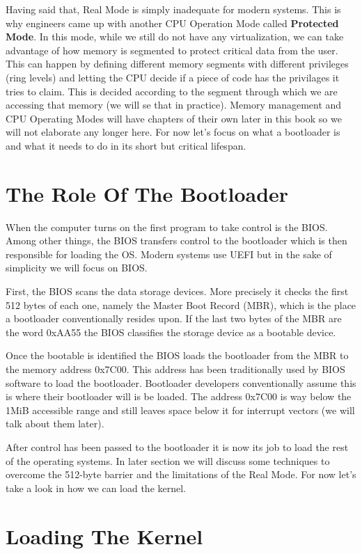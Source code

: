 Having said that, Real Mode is simply inadequate for modern systems. This is why engineers came up with another CPU 
Operation Mode called \textbf{Protected Mode}. In this mode, while we still do not have any virtualization, we can 
take advantage of how memory is segmented to protect critical data from the user. This can happen by defining different 
memory segments with different privileges (ring levels) and letting the CPU decide if a piece of code has the privilages 
it tries to claim. This is decided according to the segment through which we are accessing that memory (we will se that in
practice). Memory management and CPU Operating Modes will have chapters of their own later in this book so we will not 
elaborate any longer here. For now let's focus on what a bootloader is and what it needs to do in its short but 
critical lifespan. 

\section{The Role Of The Bootloader}

When the computer turns on the first program to take control is the BIOS. Among other things, the BIOS transfers control to 
the bootloader which is then responsible for loading the OS. Modern systems use UEFI but in the sake of simplicity we 
will focus on BIOS.

First, the BIOS scans the data storage devices. More precisely it checks the first 512 bytes of each one, namely the Master Boot Record 
(MBR), which is the place a bootloader conventionally resides upon. If the last two bytes of the MBR are the word 0xAA55 the BIOS 
classifies the storage device as a bootable device.

Once the bootable is identified the BIOS loads the bootloader from the MBR to the memory address 0x7C00. This address has been
traditionally used by BIOS software to load the bootloader. Bootloader developers conventionally assume this is where their 
bootloader will is be loaded. The address 0x7C00 is way below the 1MiB accessible range and still leaves space below 
it for interrupt vectors (we will talk about them later).

After control has been passed to the bootloader it is now its job to load the rest of the operating systems. In later section we will 
discuss some techniques to overcome the 512-byte barrier and the limitations of the Real Mode. For now let's take a look in how
we can load the kernel.

\section{Loading The Kernel}

